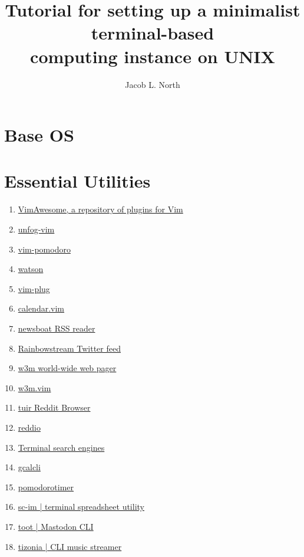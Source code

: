 \documentclass{article}
\title{Tutorial for setting up a minimalist terminal-based\\computing instance on UNIX}
\author{Jacob L. North}
\begin{document}
\maketitle

\vfill

\tableofcontents

\vfill

\section{Base OS}

\section{Essential Utilities}
\begin{enumerate}
    \item \href{https://vimawesome.com/}{VimAwesome, a repository of plugins for Vim}
    \item \href{https://github.com/unfog-io/unfog-vim}{unfog-vim}
    \item \href{https://github.com/mnick/vim-pomodoro}{vim-pomodoro}
    \item \href{https://github.com/TailorDev/Watson}{watson}
    \item \href{https://github.com/junegunn/vim-plug}{vim-plug}
    \item \href{https://github.com/itchyny/calendar.vim}{calendar.vim}
    \item \href{https://github.com/newsboat/newsboat}{newsboat RSS reader}
    \item \href{https://github.com/orakaro/rainbowstream}{Rainbowstream Twitter feed}
    \item \href{https://github.com/tats/w3m}{w3m world-wide web pager}
    \item \href{https://github.com/yuratomo/w3m.vim}{w3m.vim}
    \item \href{https://gitlab.com/ajak/tuir}{tuir Reddit Browser}
    \item \href{https://gitlab.com/aaronNG/reddio}{reddio}
    \item \href{https://vitux.com/four-web-browsers-for-the-linux-command-line/}{Terminal search engines}
    \item \href{https://github.com/insanum/gcalcli}{gcalcli}
    \item \href{https://pypi.org/project/pomodorotimer/}{pomodorotimer}
    \item \href{https://github.com/andmarti1424/sc-im}{sc-im | terminal spreadsheet utility}
    \item \href{https://pypi.org/project/toot/}{toot | Mastodon CLI}
    \item \href{https://snapcraft.io/tizonia}{tizonia | CLI music streamer}
\end{enumerate}
\end{document}
